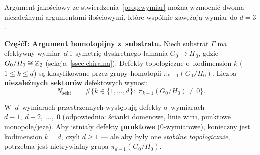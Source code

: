 
\begin{remark}[Wzmocnienie ilo\'sciowe argumentu za $d = 3$]%
\label{prop:wymiar-quantitative}
Argument jako\'sciowy ze stwierdzenia~\ref{prop:wymiar}
mo\.zna wzmocni\'c dwoma niezale\.znymi argumentami ilo\'sciowymi,
kt\'ore wsp\'olnie zawę\.zaj\k{a} wymiar do $d = 3$.

\medskip
\noindent\textbf{Cz\k{e}\'s\'c\;I: Argument homotopijny z~substratu.}
Niech substrat $\Gamma$ ma efektywny wymiar~$d$ i~symetri\k{e}
dyskretnego \l{}amania $G_0 \to H_0$, gdzie
$G_0 / H_0 \cong \mathbb{Z}_2$ (sekcja~\ref{ssec:chiralna}).
Defekty topologiczne o~kodimension $k$ ($1 \leq k \leq d$)
s\k{a} klasyfikowane przez grupy homotopii
$\pi_{k-1}(G_0 / H_0)$. Liczba \textbf{niezale\.znych
sektor\'ow} defektowych wynosi:
\begin{equation}\label{eq:N-sectors}
  N_{\mathrm{sekt}} \;=\;
  \#\bigl\{k \in \{1,\dots,d\} :\;
    \pi_{k-1}(G_0/H_0) \neq 0 \bigr\}.
\end{equation}

W~$d$~wymiarach przestrzennych wyst\k{e}puj\k{a}
defekty o~wymiarach $d{-}1,\; d{-}2,\;\dots,\; 0$
(odpowiednio: \'scianki domenowe, linie wiru,
punktowe monopole/je\.ze). Aby istnia\l{}y defekty
\textbf{punktowe} ($0$-wymiarowe), konieczny jest
kodimension $k = d$, czyli $d \geq 1$ --- ale aby by\l{}y one
\emph{stabilne topologicznie}, potrzebna jest nietrywialny
grupa $\pi_{d-1}(G_0/H_0)$.


\end{remark}
